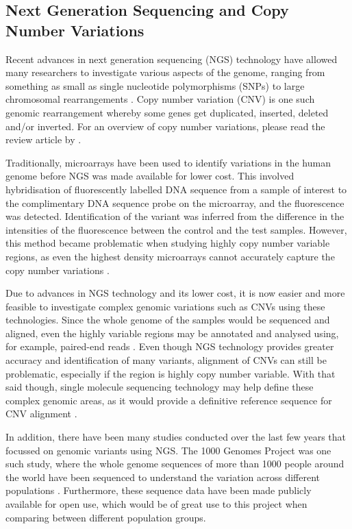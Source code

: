 \documentclass[a4paper, 12pt]{article}
\begin{document}
\subsection*{Next Generation Sequencing and Copy Number Variations}

Recent advances in next generation sequencing (NGS) technology have allowed many researchers to investigate various aspects of the genome, ranging from something as small as single nucleotide polymorphisms (SNPs) to large chromosomal rearrangements \citep{Metzker2010}.
Copy number variation (CNV) is one such genomic rearrangement whereby some genes get duplicated, inserted, deleted and/or inverted.
For an overview of copy number variations, please read the review article by \citet{Girirajan2011}.

Traditionally, microarrays have been used to identify variations in the human genome before NGS was made available for lower cost.
This involved hybridisation of fluorescently labelled DNA sequence from a sample of interest to the complimentary DNA sequence probe on the microarray, and the fluorescence was detected.
Identification of the variant was inferred from the difference in the intensities of the fluorescence between the control and the test samples.
However, this method became problematic when studying highly copy number variable regions, as even the highest density microarrays cannot accurately capture the copy number variations \citep{Girirajan2011}.

Due to advances in NGS technology and its lower cost, it is now easier and more feasible to investigate complex genomic variations such as CNVs using these technologies.
Since the whole genome of the samples would be sequenced and aligned, even the highly variable regions may be annotated and analysed using, for example, paired-end reads \citep{Girirajan2011}.
Even though NGS technology provides greater accuracy and identification of many variants, alignment of CNVs can still be problematic, especially if the region is highly copy number variable.
With that said though, single molecule sequencing technology may help define these complex genomic areas, as it would provide a definitive reference sequence for CNV alignment \citep{Rank2009}.

In addition, there have been many studies conducted over the last few years that focussed on genomic variants using NGS.
The 1000 Genomes Project was one such study, where the whole genome sequences of more than 1000 people around the world have been sequenced to understand the variation across different populations \citep{Durbin2010}.
Furthermore, these sequence data have been made publicly available for open use, which would be of great use to this project when comparing between different population groups.
\end{document}
